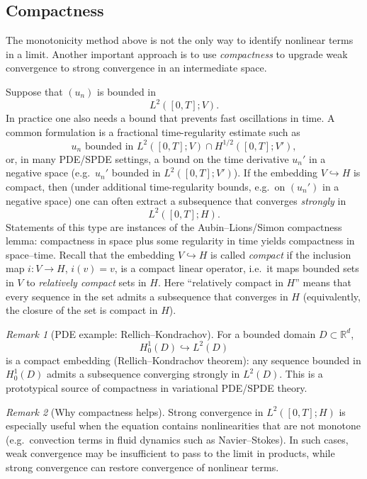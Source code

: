 \documentclass[11pt]{article}
\theoremstyle{definition}
\theoremstyle{remark}
\newtheorem{remark}{Remark}
\begin{document}
\subsection*{Compactness}

The monotonicity method above is not the only way to identify nonlinear terms in a limit.
Another important approach is to use \emph{compactness} to upgrade weak convergence to strong convergence in an intermediate space.

Suppose that $(u_n)$ is bounded in
\[
L^2([0,T];V).
\]
In practice one also needs a bound that prevents fast oscillations in time. A common formulation is a fractional time-regularity estimate such as
\[
u_n \text{ bounded in } L^2([0,T];V)\cap H^{1/2}([0,T];V'),
\]
or, in many PDE/SPDE settings, a bound on the time derivative $u_n'$ in a negative space (e.g.\ $u_n'$ bounded in $L^2([0,T];V')$).
If the embedding $V\hookrightarrow H$ is compact, then (under additional time-regularity bounds, e.g.\ on $(u_n')$ in a negative space) one can often extract a subsequence that converges \emph{strongly} in
\[
L^2([0,T];H).
\]
Statements of this type are instances of the Aubin--Lions/Simon compactness lemma: compactness in space plus some regularity in time yields compactness in space--time.
Recall that the embedding $V\hookrightarrow H$ is called \emph{compact} if the inclusion map
$i:V\to H$, $i(v)=v$, is a compact linear operator, i.e.\ it maps bounded sets in $V$ to
\emph{relatively compact} sets in $H$.
Here ``relatively compact in $H$'' means that every sequence in the set admits a subsequence that
converges in $H$ (equivalently, the closure of the set is compact in $H$).

\begin{remark}[PDE example: Rellich--Kondrachov]
For a bounded domain $D\subset\mathbb{R}^d$,
\[
H_0^1(D)\hookrightarrow L^2(D)
\]
is a compact embedding (Rellich--Kondrachov theorem): any sequence bounded in $H_0^1(D)$ admits a
subsequence converging strongly in $L^2(D)$.
This is a prototypical source of compactness in variational PDE/SPDE theory.
\end{remark}

\begin{remark}[Why compactness helps]
Strong convergence in $L^2([0,T];H)$ is especially useful when the equation contains nonlinearities that are not monotone (e.g.\ convection terms in fluid dynamics such as Navier--Stokes).
In such cases, weak convergence may be insufficient to pass to the limit in products, while strong convergence can restore convergence of nonlinear terms.
\end{remark}
\end{document}
